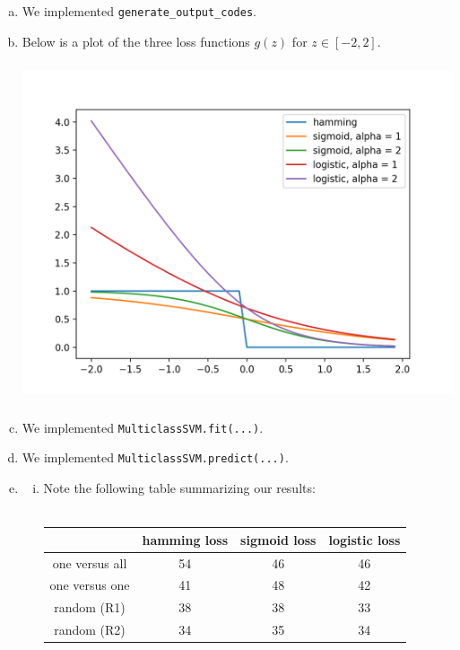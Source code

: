 \documentclass[11pt]{article}
\begin{document}
\begin{enumerate}[(a)]
	\item We implemented \verb+generate_output_codes+.
	\item Below is a plot of the three loss functions $g(z)$ for $z \in [-2, 2]$. 
\begin{center}
\includegraphics[width = 15cm, height = 10cm]{loss_funcs.png}
\end{center}
	\item We implemented \verb+MulticlassSVM.fit(...)+.
	\item We implemented \verb+MulticlassSVM.predict(...)+.
	\item 
\begin{enumerate}[i.]
	\item Note the following table summarizing our results: \\ \\
\begin{tabular}{  c | c | c | c | } 
& hamming loss & sigmoid loss & logistic loss \\
\hline
one versus all & 54 & 46 & 46\\ 
\hline
one versus one & 41 & 48 & 42\\ 
\hline
random (R1) & 38 & 38 & 33\\ 
\hline
random (R2) & 34 & 35 & 34\\ 
\hline
\end{tabular}



\end{enumerate}
\end{enumerate}
\end{document}
